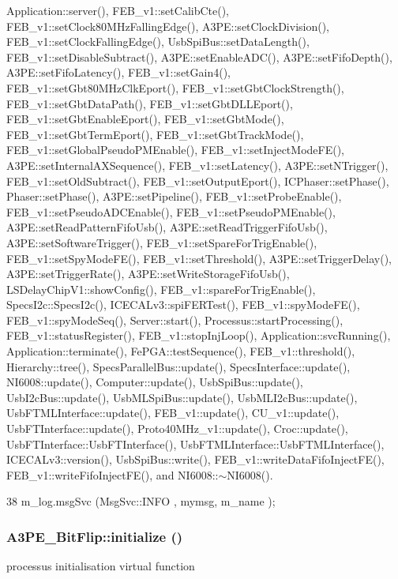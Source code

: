 Application::server(), FEB\_\-v1::setCalibCte(), FEB\_\-v1::setClock80MHzFallingEdge(), A3PE::setClockDivision(), FEB\_\-v1::setClockFallingEdge(), UsbSpiBus::setDataLength(), FEB\_\-v1::setDisableSubtract(), A3PE::setEnableADC(), A3PE::setFifoDepth(), A3PE::setFifoLatency(), FEB\_\-v1::setGain4(), FEB\_\-v1::setGbt80MHzClkEport(), FEB\_\-v1::setGbtClockStrength(), FEB\_\-v1::setGbtDataPath(), FEB\_\-v1::setGbtDLLEport(), FEB\_\-v1::setGbtEnableEport(), FEB\_\-v1::setGbtMode(), FEB\_\-v1::setGbtTermEport(), FEB\_\-v1::setGbtTrackMode(), FEB\_\-v1::setGlobalPseudoPMEnable(), FEB\_\-v1::setInjectModeFE(), A3PE::setInternalAXSequence(), FEB\_\-v1::setLatency(), A3PE::setNTrigger(), FEB\_\-v1::setOldSubtract(), FEB\_\-v1::setOutputEport(), ICPhaser::setPhase(), Phaser::setPhase(), A3PE::setPipeline(), FEB\_\-v1::setProbeEnable(), FEB\_\-v1::setPseudoADCEnable(), FEB\_\-v1::setPseudoPMEnable(), A3PE::setReadPatternFifoUsb(), A3PE::setReadTriggerFifoUsb(), A3PE::setSoftwareTrigger(), FEB\_\-v1::setSpareForTrigEnable(), FEB\_\-v1::setSpyModeFE(), FEB\_\-v1::setThreshold(), A3PE::setTriggerDelay(), A3PE::setTriggerRate(), A3PE::setWriteStorageFifoUsb(), LSDelayChipV1::showConfig(), FEB\_\-v1::spareForTrigEnable(), SpecsI2c::SpecsI2c(), ICECALv3::spiFERTest(), FEB\_\-v1::spyModeFE(), FEB\_\-v1::spyModeSeq(), Server::start(), Processus::startProcessing(), FEB\_\-v1::statusRegister(), FEB\_\-v1::stopInjLoop(), Application::svcRunning(), Application::terminate(), FePGA::testSequence(), FEB\_\-v1::threshold(), Hierarchy::tree(), SpecsParallelBus::update(), SpecsInterface::update(), NI6008::update(), Computer::update(), UsbSpiBus::update(), UsbI2cBus::update(), UsbMLSpiBus::update(), UsbMLI2cBus::update(), UsbFTMLInterface::update(), FEB\_\-v1::update(), CU\_\-v1::update(), UsbFTInterface::update(), Proto40MHz\_\-v1::update(), Croc::update(), UsbFTInterface::UsbFTInterface(), UsbFTMLInterface::UsbFTMLInterface(), ICECALv3::version(), UsbSpiBus::write(), FEB\_\-v1::writeDataFifoInjectFE(), FEB\_\-v1::writeFifoInjectFE(), and NI6008::$\sim$NI6008().


\begin{DoxyCode}
38 { m_log.msgSvc (MsgSvc::INFO    , mymsg, m_name ); }
\end{DoxyCode}
\hypertarget{classA3PE__BitFlip_a88dc6cfe690a518e38ff6d89026e6e0c}{
\subsubsection[{initialize}]{ A3PE\_\-BitFlip::initialize ()}}
\label{classA3PE__BitFlip_a88dc6cfe690a518e38ff6d89026e6e0c}
processus initialisation virtual function 

